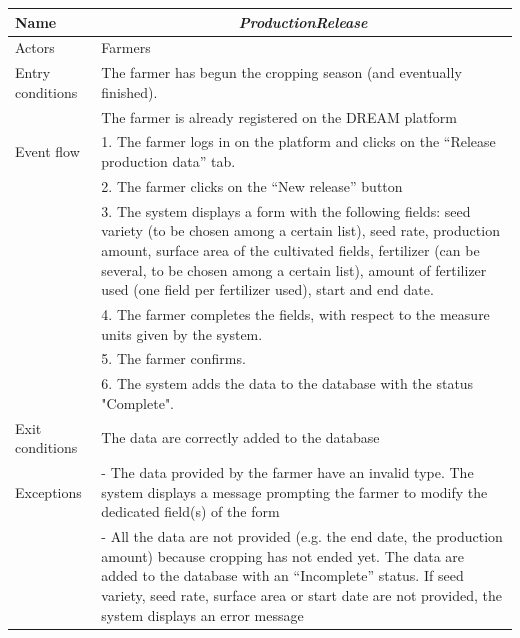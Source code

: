 \begin{table}[htbp]
	\centering
	\begin{tabularx}{\linewidth}{|l|X|}
		\hline
		Name & \multicolumn{1}{c|}{\textit{\textbf{ProductionRelease}}}                                                   \tabularnewline \hline
		Actors                                               & Farmers                                                    \tabularnewline \hline
		Entry conditions                                              & The farmer has begun the cropping season (and eventually finished). \tabularnewline
		&The farmer is already registered on the DREAM platform
		\tabularnewline \hline
		Event flow                                         & 1.	The farmer logs in on the platform and clicks on the “Release production data” tab.                                                                   \tabularnewline 
		& 2.	The farmer clicks on the “New release” button                                                   \tabularnewline 
		& 3.	The system displays a form with the following fields: seed variety (to be chosen among a certain list), seed rate, production amount, surface area of the cultivated fields, fertilizer (can be several, to be chosen among a certain list), amount of fertilizer used (one field per fertilizer used), start and end date.                                                 \tabularnewline 
		& 4.	The farmer completes the fields, with respect to the measure units given by the system.                                           \tabularnewline
		& 5.	The farmer confirms.                                               \tabularnewline
		& 6.	The system adds the data to the database with the status "Complete".      
		\tabularnewline \hline
		Exit conditions 
		& 
		The data are correctly added to the database
		\tabularnewline \hline
		Exceptions 
		& 
		-	The data provided by the farmer have an invalid type. The system displays a message prompting the farmer to modify the dedicated field(s) of the form
		\tabularnewline
		&-	All the data are not provided (e.g. the end date, the production amount) because cropping has not ended yet. The data are added to the database with an “Incomplete” status. If seed variety, seed rate, surface area or start date are not provided, the system displays an error message
		\tabularnewline
		\hline
	\end{tabularx}   
\end{table}

